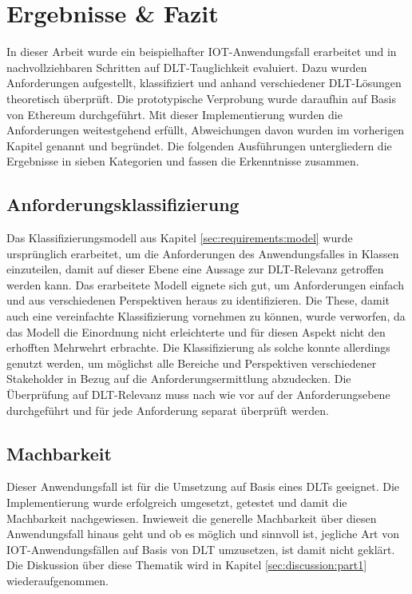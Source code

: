 \chapter{Ergebnisse \& Fazit}
\label{ch:results}
In dieser Arbeit wurde ein beispielhafter \ac{IOT}-Anwendungsfall erarbeitet und in nachvollziehbaren Schritten auf \ac{DLT}-Tauglichkeit evaluiert. Dazu wurden Anforderungen aufgestellt, klassifiziert und anhand verschiedener \ac{DLT}-Lösungen theoretisch überprüft. Die prototypische Verprobung wurde daraufhin auf Basis von Ethereum durchgeführt. Mit dieser Implementierung wurden die Anforderungen weitestgehend erfüllt, Abweichungen davon wurden im vorherigen Kapitel genannt und begründet. Die folgenden Ausführungen untergliedern die Ergebnisse in sieben Kategorien und fassen die Erkenntnisse zusammen.


\section{Anforderungsklassifizierung}
\label{sec:results:classification}
Das Klassifizierungsmodell aus Kapitel \ref{sec:requirements:model} wurde ursprünglich erarbeitet, um die Anforderungen des Anwendungsfalles in Klassen einzuteilen, damit auf dieser Ebene eine Aussage zur \ac{DLT}-Relevanz getroffen werden kann. Das erarbeitete Modell eignete sich gut, um Anforderungen einfach und aus verschiedenen Perspektiven heraus zu identifizieren. Die These, damit auch eine vereinfachte Klassifizierung vornehmen zu können, wurde verworfen, da das Modell die Einordnung nicht erleichterte und für diesen Aspekt nicht den erhofften Mehrwehrt erbrachte. Die Klassifizierung als solche konnte allerdings genutzt werden, um möglichst alle Bereiche und Perspektiven verschiedener Stakeholder in Bezug auf die Anforderungsermittlung abzudecken. Die Überprüfung auf \ac{DLT}-Relevanz muss nach wie vor auf der Anforderungsebene durchgeführt und für jede Anforderung separat überprüft werden.

\section{Machbarkeit}
\label{sec:results:feasibility}
Dieser Anwendungsfall ist für die Umsetzung auf Basis eines \acp{DLT} geeignet. Die Implementierung wurde erfolgreich umgesetzt, getestet und damit die Machbarkeit nachgewiesen. Inwieweit die generelle Machbarkeit über diesen Anwendungsfall hinaus geht und ob es möglich und sinnvoll ist, jegliche Art von \ac{IOT}-Anwendungsfällen auf Basis von \ac{DLT} umzusetzen, ist damit nicht geklärt. Die Diskussion über diese Thematik wird in Kapitel \ref{sec:discussion:part1} wiederaufgenommen.

